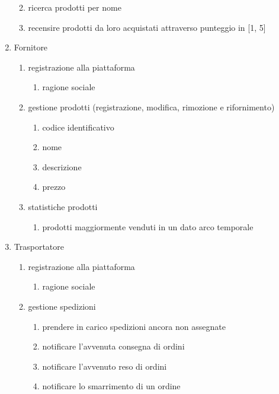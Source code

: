 \documentclass[12pt]{report}
\begin{document}
\begin{enumerate}
\begin{enumerate}
\begin{enumerate}
                    \end{enumerate}
                \item ricerca prodotti per nome
                \item recensire prodotti da loro acquistati attraverso punteggio in [1, 5]
            \end{enumerate}
        \item Fornitore
            \begin{enumerate}
                \item registrazione alla piattaforma
                    \begin{enumerate}
                        \item ragione sociale
                    \end{enumerate}
                \item gestione prodotti (registrazione, modifica, rimozione e rifornimento)
                    \begin{enumerate}
                        \item codice identificativo
                        \item nome
                        \item descrizione
                        \item prezzo
                    \end{enumerate}
                \item statistiche prodotti
                    \begin{enumerate}
                        \item prodotti maggiormente venduti in un dato arco temporale
                    \end{enumerate}
            \end{enumerate}
        \item Trasportatore
            \begin{enumerate}
                \item registrazione alla piattaforma
                    \begin{enumerate}
                        \item ragione sociale
                    \end{enumerate}
                \item gestione spedizioni
                    \begin{enumerate}
                        \item prendere in carico spedizioni ancora non assegnate
                        \item notificare l'avvenuta consegna di ordini
                        \item notificare l'avvenuto reso di ordini
                        \item notificare lo smarrimento di un ordine
                    \end{enumerate}
            \end{enumerate}
    \end{enumerate}
\end{document}
